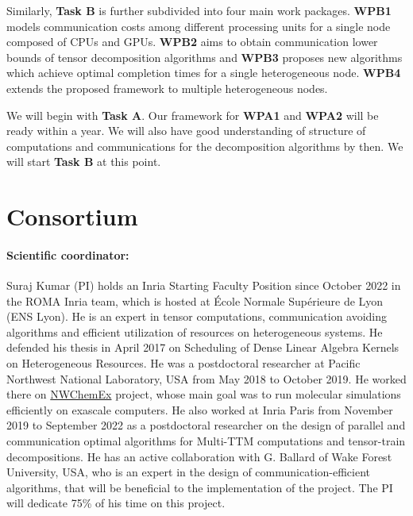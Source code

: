 \documentclass[a4paper,11pt]{article}
\begin{document}
	
	Similarly, \textbf{Task B} is further subdivided into four main work packages. \textbf{WPB1} models
	communication costs among different processing units for a single node composed of CPUs and GPUs. \textbf{WPB2} aims to obtain communication lower bounds of tensor decomposition algorithms and \textbf{WPB3} proposes new algorithms which achieve optimal completion times for a single heterogeneous node. \textbf{WPB4} extends the proposed framework to multiple heterogeneous nodes.
	
	
	
	We will begin with \textbf{Task A}. Our framework for \textbf{WPA1} and \textbf{WPA2} will be ready within a year. We will also have good understanding of structure of computations and communications for the decomposition algorithms by then. We will start \textbf{Task B} at this point.
	
	
	

	\vspace*{-0.25cm}\section{Consortium}


	\vspace*{-0.15cm}\paragraph{Scientific coordinator:}Suraj Kumar (PI) holds an Inria Starting Faculty Position since October 2022 in the ROMA Inria team, which is hosted at École Normale Supérieure de Lyon (ENS Lyon). He is an expert in tensor computations, communication avoiding algorithms and efficient utilization of resources on heterogeneous systems. He defended his thesis in April 2017 on Scheduling of Dense Linear Algebra Kernels on Heterogeneous Resources. He was a postdoctoral researcher at Pacific Northwest National Laboratory, USA from May 2018 to October 2019. He worked there on \href{https://www.exascaleproject.org/research-project/nwchemex}{NWChemEx} project, whose main goal was to run molecular simulations efficiently on exascale computers. He also worked at Inria Paris from November 2019 to September 2022 as a postdoctoral researcher on the design of parallel and communication optimal algorithms for Multi-TTM computations and tensor-train decompositions. He has an active collaboration with G. Ballard of Wake Forest University, USA, who is an expert in the design of communication-efficient algorithms, that will be beneficial to the implementation of the project. The PI will dedicate 75\% of his time on this project.
\end{document}

